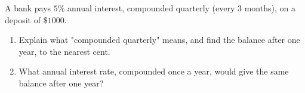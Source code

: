 A bank pays $5\%$ annual interest, compounded quarterly (every $3$ months), on a deposit of $\$1000$.
\begin{enumerate}
\item[(a)] Explain what "compounded quarterly" means, and find the balance after one year, to the nearest cent.
\item[(b)] What annual interest rate, compounded once a year, would give the same balance after one year?
\end{enumerate}

